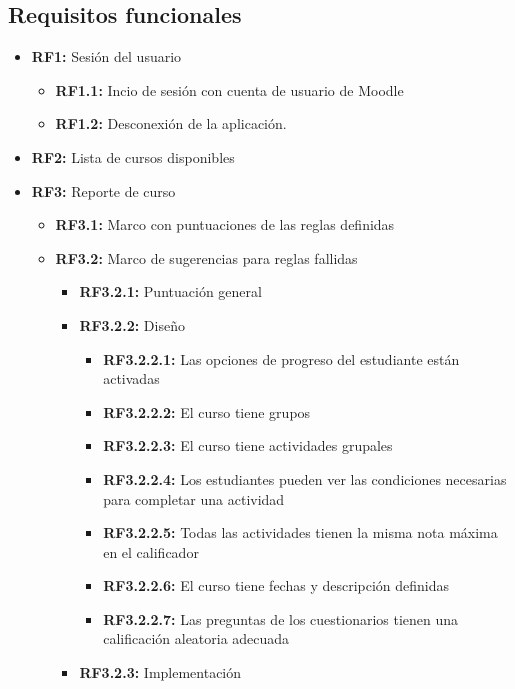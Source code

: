 \subsection{Requisitos funcionales}
\begin{itemize}
    \item \textbf{RF1:} Sesión del usuario
        \begin{itemize}
            \item \textbf{RF1.1:} Incio de sesión con cuenta de usuario de Moodle
            \item \textbf{RF1.2:} Desconexión de la aplicación.
        \end{itemize}
    \item \textbf{RF2:} Lista de cursos disponibles
    \item \textbf{RF3:} Reporte de curso
        \begin{itemize}
            \item \textbf{RF3.1:} Marco con puntuaciones de las reglas definidas
            \item \textbf{RF3.2:} Marco de sugerencias para reglas fallidas
                \begin{itemize}
                    \item \textbf{RF3.2.1:} Puntuación general
                    \item \textbf{RF3.2.2:} Diseño
                    \begin{itemize}
                        \item \textbf{RF3.2.2.1:} Las opciones de progreso del estudiante están activadas
                        \item \textbf{RF3.2.2.2:} El curso tiene grupos
                        \item \textbf{RF3.2.2.3:} El curso tiene actividades grupales
                        \item \textbf{RF3.2.2.4:} Los estudiantes pueden ver las condiciones necesarias para completar una actividad
                        \item \textbf{RF3.2.2.5:} Todas las actividades tienen la misma nota máxima en el calificador
                        \item \textbf{RF3.2.2.6:} El curso tiene fechas y descripción definidas
                        \item \textbf{RF3.2.2.7:} Las preguntas de los cuestionarios tienen una calificación aleatoria adecuada
                    \end{itemize}
                    \item \textbf{RF3.2.3:} Implementación

\end{itemize}
\end{itemize}
\end{itemize}
